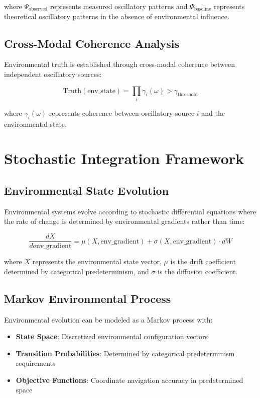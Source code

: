 \documentclass[12pt,a4paper]{article}
\begin{document}
where $\Psi_{\text{observed}}$ represents measured oscillatory patterns and $\Psi_{\text{baseline}}$ represents theoretical oscillatory patterns in the absence of environmental influence.

\subsection{Cross-Modal Coherence Analysis}

Environmental truth is established through cross-modal coherence between independent oscillatory sources:

\begin{equation}
\text{Truth}(\text{env\_state}) = \prod_i \gamma_i(\omega) > \gamma_{\text{threshold}}
\end{equation}

where $\gamma_i(\omega)$ represents coherence between oscillatory source $i$ and the environmental state.

\section{Stochastic Integration Framework}

\subsection{Environmental State Evolution}

Environmental systems evolve according to stochastic differential equations where the rate of change is determined by environmental gradients rather than time:

\begin{equation}
\frac{dX}{d\text{env\_gradient}} = \mu(X, \text{env\_gradient}) + \sigma(X, \text{env\_gradient}) \cdot dW
\end{equation}

where $X$ represents the environmental state vector, $\mu$ is the drift coefficient determined by categorical predeterminism, and $\sigma$ is the diffusion coefficient.

\subsection{Markov Environmental Process}

Environmental evolution can be modeled as a Markov process with:

\begin{itemize}
\item \textbf{State Space}: Discretized environmental configuration vectors
\item \textbf{Transition Probabilities}: Determined by categorical predeterminism requirements
\item \textbf{Objective Functions}: Coordinate navigation accuracy in predetermined space
\end{itemize}
\end{document}
